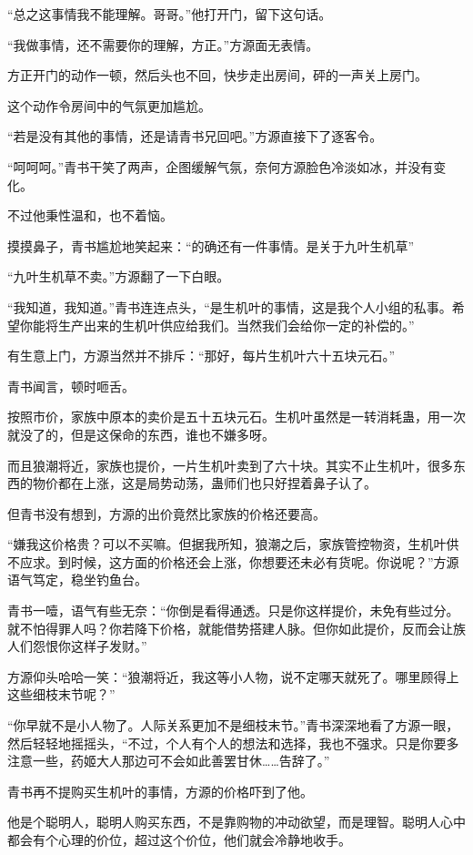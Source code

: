 \begin{this_body}
“总之这事情我不能理解。哥哥。”他打开门，留下这句话。

“我做事情，还不需要你的理解，方正。”方源面无表情。

方正开门的动作一顿，然后头也不回，快步走出房间，砰的一声关上房门。

这个动作令房间中的气氛更加尴尬。

“若是没有其他的事情，还是请青书兄回吧。”方源直接下了逐客令。

“呵呵呵。”青书干笑了两声，企图缓解气氛，奈何方源脸色冷淡如冰，并没有变化。

不过他秉性温和，也不着恼。

摸摸鼻子，青书尴尬地笑起来：“的确还有一件事情。是关于九叶生机草”

“九叶生机草不卖。”方源翻了一下白眼。

“我知道，我知道。”青书连连点头，“是生机叶的事情，这是我个人小组的私事。希望你能将生产出来的生机叶供应给我们。当然我们会给你一定的补偿的。”

有生意上门，方源当然并不排斥：“那好，每片生机叶六十五块元石。”

青书闻言，顿时咂舌。

按照市价，家族中原本的卖价是五十五块元石。生机叶虽然是一转消耗蛊，用一次就没了的，但是这保命的东西，谁也不嫌多呀。

而且狼潮将近，家族也提价，一片生机叶卖到了六十块。其实不止生机叶，很多东西的物价都在上涨，这是局势动荡，蛊师们也只好捏着鼻子认了。

但青书没有想到，方源的出价竟然比家族的价格还要高。

“嫌我这价格贵？可以不买嘛。但据我所知，狼潮之后，家族管控物资，生机叶供不应求。到时候，这方面的价格还会上涨，你想要还未必有货呢。你说呢？”方源语气笃定，稳坐钓鱼台。

青书一噎，语气有些无奈：“你倒是看得通透。只是你这样提价，未免有些过分。就不怕得罪人吗？你若降下价格，就能借势搭建人脉。但你如此提价，反而会让族人们怨恨你这样子发财。”

方源仰头哈哈一笑：“狼潮将近，我这等小人物，说不定哪天就死了。哪里顾得上这些细枝末节呢？”

“你早就不是小人物了。人际关系更加不是细枝末节。”青书深深地看了方源一眼，然后轻轻地摇摇头，“不过，个人有个人的想法和选择，我也不强求。只是你要多注意一些，药姬大人那边可不会如此善罢甘休……告辞了。”

青书再不提购买生机叶的事情，方源的价格吓到了他。

他是个聪明人，聪明人购买东西，不是靠购物的冲动欲望，而是理智。聪明人心中都会有个心理的价位，超过这个价位，他们就会冷静地收手。


\end{this_body}
